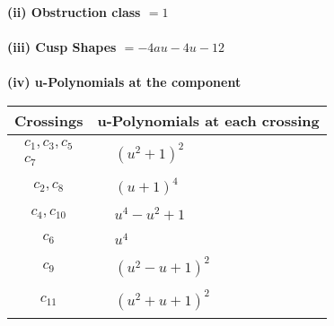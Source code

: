 \documentclass[1p]{elsarticle_modified}
\theoremstyle{definition}
\begin{document}
\flushleft \textbf{(ii) Obstruction class $= 1$}\\~\\
\flushleft \textbf{(iii) Cusp Shapes $= -4 a u-4 u-12$}\\~\\
\newpage\renewcommand{\arraystretch}{1}
\flushleft \textbf{(iv) u-Polynomials at the component}\newline \\
\begin{tabular}{m{50pt}|m{274pt}}
Crossings & \hspace{64pt}u-Polynomials at each crossing \\
\hline $$\begin{aligned}c_{1},c_{3},c_{5}\\c_{7}\end{aligned}$$&$\begin{aligned}
&(u^2+1)^2
\end{aligned}$\\
\hline $$\begin{aligned}c_{2},c_{8}\end{aligned}$$&$\begin{aligned}
&(u+1)^4
\end{aligned}$\\
\hline $$\begin{aligned}c_{4},c_{10}\end{aligned}$$&$\begin{aligned}
&u^4- u^2+1
\end{aligned}$\\
\hline $$\begin{aligned}c_{6}\end{aligned}$$&$\begin{aligned}
&u^4
\end{aligned}$\\
\hline $$\begin{aligned}c_{9}\end{aligned}$$&$\begin{aligned}
&(u^2- u+1)^2
\end{aligned}$\\
\hline $$\begin{aligned}c_{11}\end{aligned}$$&$\begin{aligned}
&(u^2+u+1)^2
\end{aligned}$\\
\hline
\end{tabular}\\~\\
\end{document}
